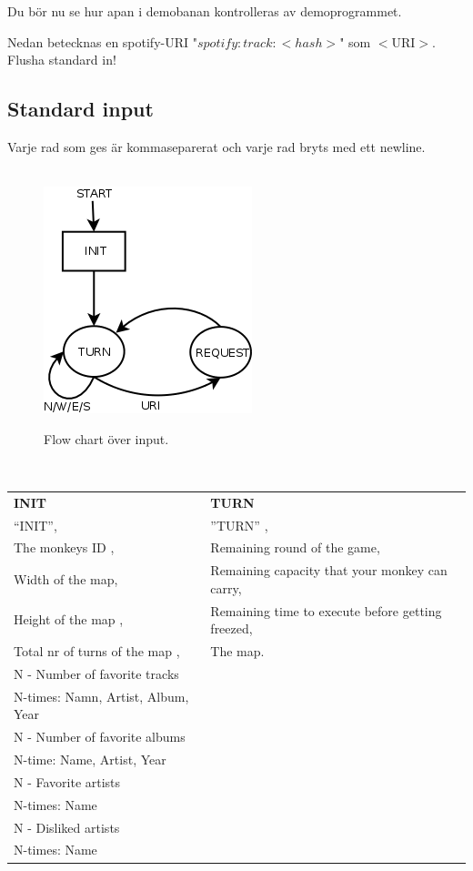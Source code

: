 \documentclass[a4paper, 10pt]{article}
\begin{document}
Du bör nu se hur apan i demobanan kontrolleras av demoprogrammet.

Nedan betecknas en spotify-URI "$spotify:track:<hash>$" som $<$URI$>$.
\\
Flusha standard in! 
\newpage
\subsection*{Standard input}
Varje rad som ges är kommaseparerat och varje rad bryts med ett newline.\\\\
\begin{figure}[h!]
\centering
\includegraphics[scale=0.2]{stdinflow} \\
\caption{Flow chart över input. }
\end{figure} \\
\begin{tabular}{l l}
\textbf{INIT}				 & \textbf{TURN} \\
“INIT”,				 & ”TURN” , \\
The monkeys ID , 	 & Remaining round of the game,	\\
Width of the map,  & Remaining capacity that your monkey can carry,\\
Height of the map , & Remaining time to execute before getting freezed,  \\
Total nr of turns of the map , & The map. \\ 
N - Number of favorite tracks  \\
N-times: Namn, Artist, Album, Year  \\
N - Number of favorite albums \\
N-time: Name, Artist, Year \\
N - Favorite artists \\
N-times: Name\\
N - Disliked artists \\
N-times: Name \\
\end{tabular}
\end{document}
